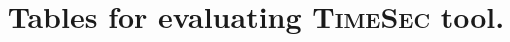 \documentclass[runningheads]{llncs}
\title{Tables for evaluating \textsc{TimeSec} tool.}
\begin{document}
\maketitle

\newcommand{\depslabel}{\textsc{Deps}}
\newcommand{\invlabel}{\textsc{Inv}}
\newcommand{\lplabel}{\textsc{LP}}
\newcommand{\nodepnoopt}{\textsc{Deps}}
\newcommand{\depnoopt}{\textsc{Opts}}
\newcommand{\depopt}{\textsc{Full}}
\newcommand{\toolname}{\textsc{TimeSec}}
\newcommand{\bignum}{\textsc{S2N-Bignum}}
\newcommand{\spacearound}[1]{\;#1\;}

\setcounter{table}{4} %






\end{document}

